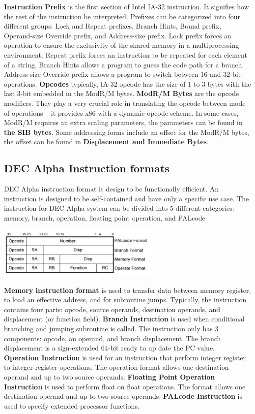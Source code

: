 \documentclass[letterpaper,10pt,titlepage]{article}
\begin{document}
\textbf{Instruction Prefix} is the first section of Intel IA-32 instruction. 
It signifies how the rest of the instruction be interpreted. Prefixes can be 
categorized into four different groups: Lock and Repeat prefixes, Branch Hints, Bound
prefix, Operand-size Override prefix, and Address-size prefix. Lock prefix 
forces an operation to ensure the exclusivity of the shared memory in a multiprocessing 
environment. Repeat prefix forces an instruction to be repeated for each element
of a string. Branch Hints allows a program to guess the code path for a branch.
Address-size Override prefix allows a program to switch between 16 and 32-bit 
operations. \textbf{Opcodes} typically, IA-32 opcode has the size of 1 to 3 bytes with
the last 3-bit embedded in the ModR/M bytes. \textbf{ModR/M Bytes} are the 
opcode modifiers. They play a very crucial role in translating the opcode between mode
of operations -- it provides x86 with a dynamic opcode scheme. In some cases, ModR/M
requires an extra scaling parameters, the parameters can be found in \textbf{the SIB 
bytes}. Some addressing forms include an offset for the ModR/M bytes, the offset can be 
found in \textbf{Displacement and Immediate Bytes}. 

\subsection{DEC Alpha Instruction formats}
DEC Alpha instruction format is design to be functionally efficient. 
An instruction is designed to be self-contained and have only a specific use case.
The instruction for DEC Alpha system can be divided into 5 different categories:
memory, branch, operation, floating point operation, and PALcode

\begin{center}
   \includegraphics[width=0.6\textwidth]{instr_format_alp.JPG}
\end{center}


\textbf{Memory instruction format} is used to transfer data between memory register,
to load an effective address, and for subroutine jumps. Typically, the instruction 
contains four parts: opcode, source operands, destination operands, and displacement
(or function field). \textbf{Branch Instruction} is used when conditional branching 
and jumping subroutine is called. The instruction only has 3 components: opcode, 
an operand, and branch displacement. The branch displacement is a sign-extended 64-bit
ready to up date the PC value. \textbf{Operation Instruction} is used for an instruction
that perform integer register to integer register operations. The operation format allows
one destination operand and up to two source operands. \textbf{Floating Point Operation
Instruction} is used to perform float on float operations. The format allows one 
destination operand and up to two source operands. \textbf{PALcode Instruction} is used
to specify extended processor functions. 
\end{document}
